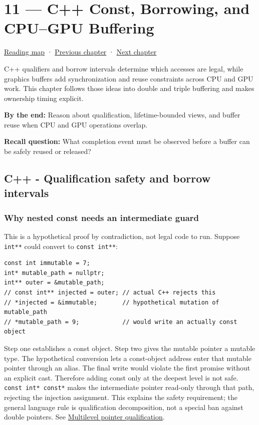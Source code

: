 \hypertarget{01-foundations-i-ch011}{}
\section{11 --- C++ Const, Borrowing, and CPU--GPU Buffering}\label{c-const-borrowing-and-cpugpu-buffering}

\href{Chapter\%20Edition/01\%20-\%20Computing\%20Foundations/00\%20-\%20Reading\%20Map}{Reading map} · \hyperref[01-foundations-i-ch010]{Previous chapter} · \hyperref[01-foundations-i-ch012]{Next chapter}

C++ qualifiers and borrow intervals determine which accesses are legal, while graphics buffers add synchronization and reuse constraints across CPU and GPU work. This chapter follows those ideas into double and triple buffering and makes ownership timing explicit.

\textbf{By the end:} Reason about qualification, lifetime-bounded views, and buffer reuse when CPU and GPU operations overlap.

\textbf{Recall question:} What completion event must be observed before a buffer can be safely reused or released?

\subsection{C++ - Qualification safety and borrow intervals}\label{c---qualification-safety-and-borrow-intervals}

\subsubsection{Why nested const needs an intermediate guard}\label{why-nested-const-needs-an-intermediate-guard}

This is a hypothetical proof by contradiction, not legal code to run. Suppose \texttt{int**} could convert to \texttt{const\ int**}:

\begin{verbatim}
const int immutable = 7;
int* mutable_path = nullptr;
int** outer = &mutable_path;
// const int** injected = outer; // actual C++ rejects this
// *injected = &immutable;       // hypothetical mutation of mutable_path
// *mutable_path = 9;            // would write an actually const object
\end{verbatim}

Step one establishes a const object. Step two gives the mutable pointer a mutable type. The hypothetical conversion lets a const-object address enter that mutable pointer through an alias. The final write would violate the first promise without an explicit cast. Therefore adding const only at the deepest level is not safe. \texttt{const\ int*\ const*} makes the intermediate pointer read-only through that path, rejecting the injection assignment. This explains the safety requirement; the general language rule is qualification decomposition, not a special ban against double pointers. See \hyperref[appendix-5e1a7561cd98]{Multilevel pointer qualification}.

